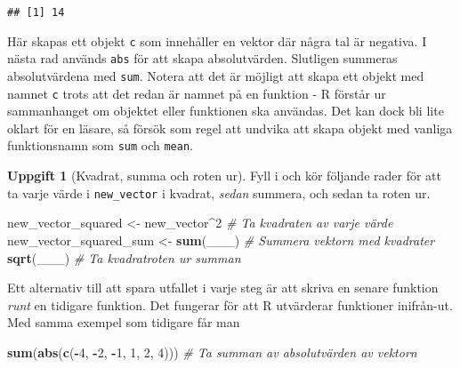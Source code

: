 \documentclass[
]{book}
\newenvironment{Shaded}{\begin{snugshade}}{\end{snugshade}}
\newcommand{\CommentTok}[1]{\textcolor[rgb]{0.56,0.35,0.01}{\textit{#1}}}
\newcommand{\DecValTok}[1]{\textcolor[rgb]{0.00,0.00,0.81}{#1}}
\newcommand{\FunctionTok}[1]{\textcolor[rgb]{0.13,0.29,0.53}{\textbf{#1}}}
\newcommand{\NormalTok}[1]{#1}
\newcommand{\OtherTok}[1]{\textcolor[rgb]{0.56,0.35,0.01}{#1}}
\newcommand{\SpecialCharTok}[1]{\textcolor[rgb]{0.81,0.36,0.00}{\textbf{#1}}}
\theoremstyle{definition}
\theoremstyle{definition}
\theoremstyle{definition}
\newtheorem{exercise}{Uppgift}[chapter]
\theoremstyle{definition}
\theoremstyle{remark}
\begin{document}
\begin{verbatim}
## [1] 14
\end{verbatim}

Här skapas ett objekt \texttt{c} som innehåller en vektor där några tal är negativa. I nästa rad används \texttt{abs} för att skapa absolutvärden. Slutligen summeras absolutvärdena med \texttt{sum}.
Notera att det är möjligt att skapa ett objekt med namnet \texttt{c} trots att det redan är namnet på en funktion - R förstår ur sammanhanget om objektet eller funktionen ska användas. Det kan dock bli lite oklart för en läsare, så försök som regel att undvika att skapa objekt med vanliga funktionsnamn som \texttt{sum} och \texttt{mean}.

\begin{exercise}[Kvadrat, summa och roten ur]

Fyll i och kör följande rader för att ta varje värde i \texttt{new\_vector} i kvadrat, \emph{sedan} summera, och sedan ta roten ur.

\begin{Shaded}
\begin{Highlighting}[]
\NormalTok{new\_vector\_squared }\OtherTok{\textless{}{-}}\NormalTok{ new\_vector}\SpecialCharTok{\^{}}\DecValTok{2}     \CommentTok{\# Ta kvadraten av varje värde}
\NormalTok{new\_vector\_squared\_sum }\OtherTok{\textless{}{-}} \FunctionTok{sum}\NormalTok{(\_\_\_)     }\CommentTok{\# Summera vektorn med kvadrater}
\FunctionTok{sqrt}\NormalTok{(\_\_\_)                              }\CommentTok{\# Ta kvadratroten ur summan}
\end{Highlighting}
\end{Shaded}

\end{exercise}

Ett alternativ till att spara utfallet i varje steg är att skriva en senare funktion \emph{runt} en tidigare funktion. Det fungerar för att R utvärderar funktioner inifrån-ut. Med samma exempel som tidigare får man

\begin{Shaded}
\begin{Highlighting}[]
\FunctionTok{sum}\NormalTok{(}\FunctionTok{abs}\NormalTok{(}\FunctionTok{c}\NormalTok{(}\SpecialCharTok{{-}}\DecValTok{4}\NormalTok{, }\SpecialCharTok{{-}}\DecValTok{2}\NormalTok{, }\SpecialCharTok{{-}}\DecValTok{1}\NormalTok{, }\DecValTok{1}\NormalTok{, }\DecValTok{2}\NormalTok{, }\DecValTok{4}\NormalTok{)))       }\CommentTok{\# Ta summan av absolutvärden av vektorn}
\end{Highlighting}
\end{Shaded}
\end{document}
